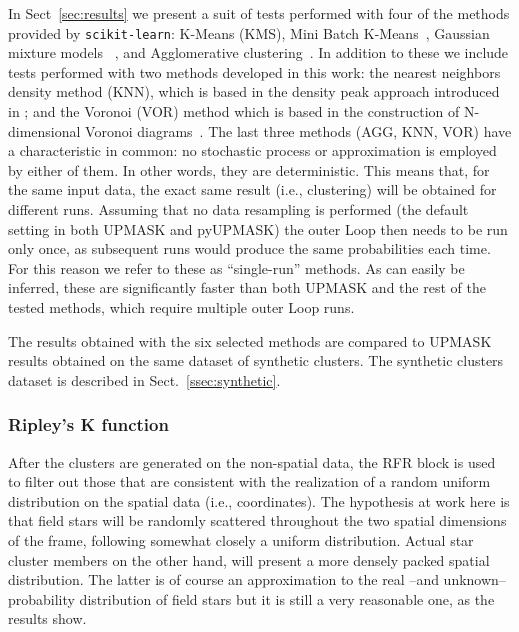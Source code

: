 \documentclass[draft]{aa}
\begin{document}
 In Sect~\ref{sec:results} we present a suit of tests performed with
 four of the methods provided by \texttt{scikit-learn}: K-Means (KMS), Mini
 Batch K-Means~\citep[MBK,][]{Sculley2010}, Gaussian mixture models~
 \citep[GMM,][]{Baxter2010}, and Agglomerative
 clustering~\citep[AGG,][]{Zepeda2013}.
 In addition to these we include tests performed with two methods developed in
 this work: the nearest neighbors density method (KNN), which is based in the
 density peak approach introduced in \cite{Rodriguez2014}; and the 
 Voronoi (VOR) method which is based in the construction of N-dimensional
 Voronoi diagrams~\citep{Voronoi_1908}.
 The last three methods (AGG, KNN, VOR) have a characteristic in common:
 no stochastic process or approximation is employed by either of them. In
 other words, they are deterministic.
 This means that, for the same input data, the exact same result (i.e.,
 clustering) will be obtained for different runs.
 Assuming that no data resampling is performed (the default setting in both
 UPMASK and pyUPMASK) the outer Loop then needs to be run only once, as
 subsequent runs would produce the same probabilities each time. For this
 reason we refer to these as ``single-run'' methods. As can easily be
 inferred, these are significantly faster than both UPMASK and the rest of the
 tested methods, which require multiple outer Loop runs.

 The results obtained with the six selected methods are compared to UPMASK
 results obtained on the same dataset of synthetic clusters. The synthetic
 clusters dataset is described in  Sect.~\ref{ssec:synthetic}.



\subsubsection{Ripley's K function}
 \label{sssec:ripley}

 After the clusters are generated on the non-spatial data, the RFR block is
 used to filter out those that are consistent with the realization of a random
 uniform distribution on the spatial data (i.e., coordinates). The hypothesis
 at work here is that field stars will be randomly scattered throughout the
 two spatial dimensions of the frame, following somewhat closely a uniform
 distribution. Actual star cluster members on the other hand, will present a
 more densely packed spatial distribution.
 The latter is of course an approximation to the real --and unknown--
 probability distribution of field stars but it is still a very reasonable
 one, as the results show.
\end{document}
